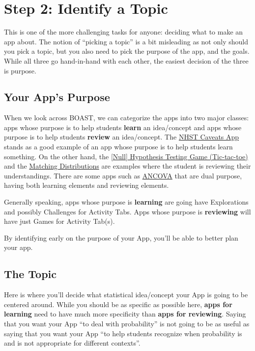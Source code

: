\documentclass[
]{book}
\begin{document}
\hypertarget{step2}{%
\section{Step 2: Identify a Topic}\label{step2}}

This is one of the more challenging tasks for anyone: deciding what to make an app about. The notion of ``picking a topic'' is a bit misleading as not only should you pick a topic, but you also need to pick the purpose of the app, and the goals. While all three go hand-in-hand with each other, the easiest decision of the three is purpose.

\hypertarget{step2a}{%
\subsection{Your App's Purpose}\label{step2a}}

When we look across BOAST, we can categorize the apps into two major classes: apps whose purpose is to help students \textbf{learn} an idea/concept and apps whose purpose is to help students \textbf{review} an idea/concept. The \href{https://psu-eberly.shinyapps.io/Significance_Testing_Caveats/}{NHST Caveats App} stands as a good example of an app whose purpose is to help students learn something. On the other hand, the \href{https://psu-eberly.shinyapps.io/Hypothesis_Testing_Game/}{{[}Null{]} Hypothesis Testing Game (Tic-tac-toe)} and the \href{https://psu-eberly.shinyapps.io/Matching_Distributions/}{Matching Distributions} are examples where the student is reviewing their understandings. There are some apps such as \href{https://psu-eberly.shinyapps.io/ANCOVA/}{ANCOVA} that are dual purpose, having both learning elements and reviewing elements.

Generally speaking, apps whose purpose is \textbf{learning} are going have Explorations and possibly Challenges for Activity Tabs. Apps whose purpose is \textbf{reviewing} will have just Games for Activity Tab(s).

By identifying early on the purpose of your App, you'll be able to better plan your app.

\hypertarget{step2b}{%
\subsection{The Topic}\label{step2b}}

Here is where you'll decide what statistical idea/concept your App is going to be centered around. While you should be as specific as possible here, \textbf{apps for learning} need to have much more specificity than \textbf{apps for reviewing}. Saying that you want your App ``to deal with probability'' is not going to be as useful as saying that you want your App ``to help students recognize when probability is and is not appropriate for different contexts''.
\end{document}

